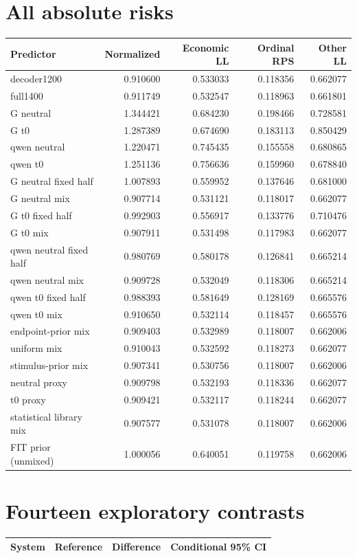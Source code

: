 \documentclass[10pt]{article}
\begin{document}
\section{All absolute risks}
\begin{longtable}{lrrrr}\toprule
Predictor & Normalized & Economic LL & Ordinal RPS & Other LL\\\midrule
decoder1200 & 0.910600 & 0.533033 & 0.118356 & 0.662077\\
full1400 & 0.911749 & 0.532547 & 0.118963 & 0.661801\\
G neutral & 1.344421 & 0.684230 & 0.198466 & 0.728581\\
G t0 & 1.287389 & 0.674690 & 0.183113 & 0.850429\\
qwen  neutral & 1.220471 & 0.745435 & 0.155558 & 0.680865\\
qwen  t0 & 1.251136 & 0.756636 & 0.159960 & 0.678840\\
G neutral  fixed half & 1.007893 & 0.559952 & 0.137646 & 0.681000\\
G neutral mix & 0.907714 & 0.531121 & 0.118017 & 0.662077\\
G t0  fixed half & 0.992903 & 0.556917 & 0.133776 & 0.710476\\
G t0 mix & 0.907911 & 0.531498 & 0.117983 & 0.662077\\
qwen  neutral  fixed half & 0.980769 & 0.580178 & 0.126841 & 0.665214\\
qwen  neutral mix & 0.909728 & 0.532049 & 0.118306 & 0.665214\\
qwen  t0  fixed half & 0.988393 & 0.581649 & 0.128169 & 0.665576\\
qwen  t0 mix & 0.910650 & 0.532114 & 0.118457 & 0.665576\\
endpoint-prior mix & 0.909403 & 0.532989 & 0.118007 & 0.662006\\
uniform mix & 0.910043 & 0.532592 & 0.118273 & 0.662077\\
stimulus-prior mix & 0.907341 & 0.530756 & 0.118007 & 0.662006\\
neutral proxy & 0.909798 & 0.532193 & 0.118336 & 0.662077\\
t0 proxy & 0.909421 & 0.532117 & 0.118244 & 0.662077\\
statistical library mix & 0.907577 & 0.531078 & 0.118007 & 0.662006\\
FIT prior (unmixed) & 1.000056 & 0.640051 & 0.119758 & 0.662006\\
\bottomrule\end{longtable}\section{Fourteen exploratory contrasts}\begin{longtable}{llrr}\toprule System & Reference & Difference & Conditional 95\% CI\\\midrule

\end{longtable}
\end{document}
